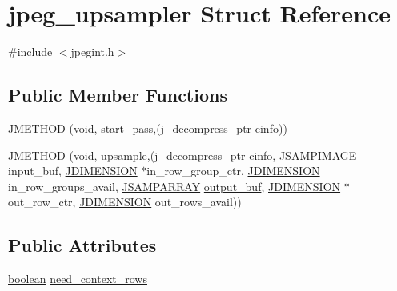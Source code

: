 \hypertarget{structjpeg__upsampler}{}\section{jpeg\+\_\+upsampler Struct Reference}
\label{structjpeg__upsampler}


{\ttfamily \#include $<$jpegint.\+h$>$}

\subsection*{Public Member Functions}
\begin{DoxyCompactItemize}
\item 
\hyperlink{structjpeg__upsampler_a01ac725bfe78e05e7671547504a95346}{J\+M\+E\+T\+H\+O\+D} (\hyperlink{png_8h_aa8c59027f9ab2769342f248709d68d17}{void}, \hyperlink{jddctmgr_8c_a1964f006adb8fb80f57e455f6452aec1}{start\+\_\+pass},(\hyperlink{jpeglib_8h_a00c7d78af44bd26a901c791ccfc1e178}{j\+\_\+decompress\+\_\+ptr} cinfo))
\item 
\hyperlink{structjpeg__upsampler_a23e9af5ee7259d39179063e3ece9fb8f}{J\+M\+E\+T\+H\+O\+D} (\hyperlink{png_8h_aa8c59027f9ab2769342f248709d68d17}{void}, upsample,(\hyperlink{jpeglib_8h_a00c7d78af44bd26a901c791ccfc1e178}{j\+\_\+decompress\+\_\+ptr} cinfo, \hyperlink{jpeglib_8h_a4bf858e4d42202287e786bdec2f3b62b}{J\+S\+A\+M\+P\+I\+M\+A\+G\+E} input\+\_\+buf, \hyperlink{jmorecfg_8h_a04ed4674f6f1d0d50ec241531e38274f}{J\+D\+I\+M\+E\+N\+S\+I\+O\+N} $\ast$in\+\_\+row\+\_\+group\+\_\+ctr, \hyperlink{jmorecfg_8h_a04ed4674f6f1d0d50ec241531e38274f}{J\+D\+I\+M\+E\+N\+S\+I\+O\+N} in\+\_\+row\+\_\+groups\+\_\+avail, \hyperlink{jpeglib_8h_ac9d5d1b829ed51769db69a37271a7e91}{J\+S\+A\+M\+P\+A\+R\+R\+A\+Y} \hyperlink{jdct_8h_ad7e4660a191b1a791748dd44d5a7a0ec}{output\+\_\+buf}, \hyperlink{jmorecfg_8h_a04ed4674f6f1d0d50ec241531e38274f}{J\+D\+I\+M\+E\+N\+S\+I\+O\+N} $\ast$out\+\_\+row\+\_\+ctr, \hyperlink{jmorecfg_8h_a04ed4674f6f1d0d50ec241531e38274f}{J\+D\+I\+M\+E\+N\+S\+I\+O\+N} out\+\_\+rows\+\_\+avail))
\end{DoxyCompactItemize}
\subsection*{Public Attributes}
\begin{DoxyCompactItemize}
\item 
\hyperlink{jmorecfg_8h_a7c6368b321bd9acd0149b030bb8275ed}{boolean} \hyperlink{structjpeg__upsampler_af1ed2e1ca01280221b9c1305fc557e45}{need\+\_\+context\+\_\+rows}
\end{DoxyCompactItemize}


